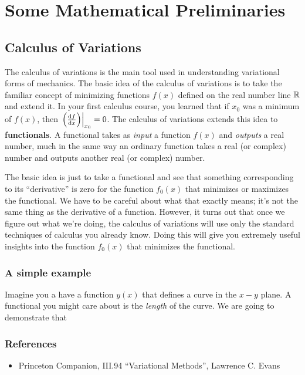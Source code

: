\chapter{Some Mathematical Preliminaries}
\section{Calculus of Variations}
\label{sec:calc_var}

The calculus of variations is the main tool used in understanding variational forms of mechanics. The basic idea of the calculus of variations is to take the familiar concept of minimizing functions $f(x)$ defined on the real number line $\mathbb{R}$ and extend it. In your first calculus course, you learned that if $x_0$ was a minimum of $f(x)$, then $\eval{\qty(\dv{f}{x})}_{x_0} = 0$. 
The calculus of variations extends this idea to \textbf{functionals}. A functional takes as \emph{input} a function $f(x)$ and \emph{outputs} a real number, much in the same way an ordinary function takes a real (or complex) number and outputs another real (or complex) number.

The basic idea is just to take a functional and see that something corresponding to its ``derivative'' is zero for the function $f_0(x)$ that minimizes or maximizes the functional. We have to be careful about what that exactly means; it's not the same thing as the derivative of a function. However, it turns out that once we figure out what we're doing, the calculus of variations will use only the standard techniques of calculus you already know. Doing this will give you extremely useful insights into the function $f_0(x)$ that minimizes the functional. 


\subsection{A simple example}
Imagine you a have a function $y(x)$ that defines a curve in the $x-y$ plane. A functional you might care about is the \emph{length} of the curve. We are going to demonstrate that 
\subsection{References}
\begin{itemize}
\item Princeton Companion, III.94 ``Variational Methods'', Lawrence C. Evans
\end{itemize}


